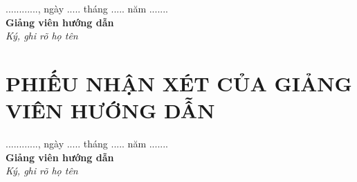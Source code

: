 \vspace{6pt}
\hfill\begin{minipage}{8cm}\centering
............, ngày ..... tháng ..... năm .......\\
\textbf{Giảng viên hướng dẫn}\\
\textit{Ký, ghi rõ họ tên}
\end{minipage}

\clearpage
\section*{PHIẾU NHẬN XÉT CỦA GIẢNG VIÊN HƯỚNG DẪN}
\vspace{6pt}
\hfill\begin{minipage}{8cm}\centering
............, ngày ..... tháng ..... năm .......\\
\textbf{Giảng viên hướng dẫn}\\
\textit{Ký, ghi rõ họ tên}
\end{minipage}

